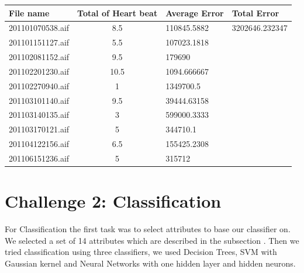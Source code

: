 \documentclass{article}
\begin{document}
\begin{center}
\begin{tabular}{|l |c |l |l|}
\hline
File name & Total of Heart beat & Average Error & Total Error \\
\hline
201101070538.aif & 8.5 & 110845.5882 & 3202646.232347 \\
201101151127.aif&5.5&107023.1818& \\
201102081152.aif&9.5&179690& \\
201102201230.aif&10.5&1094.666667& \\
201102270940.aif&1&1349700.5& \\
201103101140.aif&9.5&39444.63158& \\
201103140135.aif&3&599000.3333& \\
201103170121.aif&5&344710.1& \\
201104122156.aif&6.5&155425.2308& \\
201106151236.aif&5&315712& \\
\hline
\end{tabular}
\end{center}
\section{Challenge 2: Classification}
For Classification the first task was to select attributes to base our classifier on. We selected a set of 14 attributes which are described in the subsection . Then we tried classification using three classifiers, we used Decision Trees, SVM with Gaussian kernel and Neural Networks with one hidden layer and hidden neurons.
\end{document}
